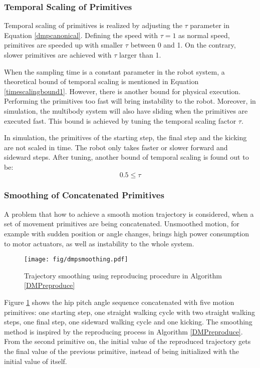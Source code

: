\subsubsection{Temporal Scaling of Primitives}
Temporal scaling of primitives is realized by adjusting the $ \tau $ parameter in Equation {\ref{dmpcanonical}}. Defining the speed with $ \tau = 1 $ as normal speed, primitives are speeded up with smaller $ \tau $ between 0 and 1. On the contrary, slower primitives are achieved with $ \tau $ larger than 1.

When the sampling time is a constant parameter in the robot system, a theoretical bound of temporal scaling is mentioned in Equation {\ref{timescalingbound1}}. However, there is another bound for physical execution. Performing the primitives too fast will bring instability to the robot. Moreover, in simulation, the multibody system will also have sliding when the primitives are executed fast. This bound is achieved by tuning the temporal scaling factor $ \tau $. 

In simulation, the primitives of the starting step, the final step and the kicking are not scaled in time. The robot only takes faster or slower forward and sideward steps. After tuning, another bound of temporal scaling is found out to be:
\begin{equation}
	0.5 \leqslant \tau
\end{equation}

\subsubsection{Smoothing of Concatenated Primitives}
A problem that how to achieve a smooth motion trajectory is considered, when a set of movement primitives are being concatenated. Unsmoothed motion, for example with sudden position or angle changes, brings high power consumption to motor actuators, as well as instability to the whole system.

\begin{figure}[H]
	\centering
	\texttt{[image: fig/dmpsmoothing.pdf]}
	\caption{Trajectory smoothing using reproducing procedure in Algorithm {\ref{DMPreproduce}}}
	\label{dmpsmooth}
\end{figure}

Figure {\ref{dmpsmooth}} shows the hip pitch angle sequence concatenated with five motion primitives: one starting step, one straight walking cycle with two straight walking steps, one final step, one sideward walking cycle and one kicking. The smoothing method is inspired by the reproducing process in Algorithm {\ref{DMPreproduce}}. From the second primitive on, the initial value of the reproduced trajectory gets the final value of the previous primitive, instead of being initialized with the initial value of itself.



